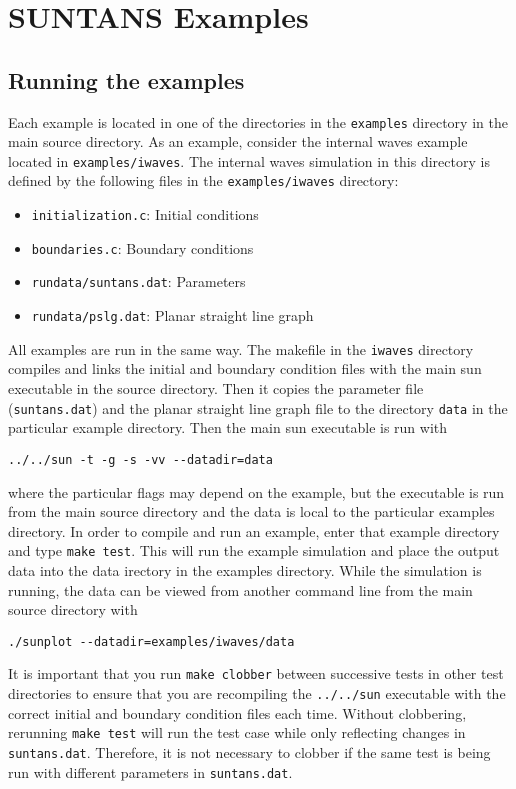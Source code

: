 \documentclass[12pt,oneside]{article}
\begin{document}
\section{SUNTANS Examples} \label{sec:examples}

\subsection{Running the examples}

Each example is located in one of the directories in the \verb+examples+ directory in
the main source directory.  As an example, consider the internal waves example located
in \verb+examples/iwaves+.  The internal waves simulation in this directory is defined by the following files
in the \verb+examples/iwaves+ directory:
\begin{itemize}
\item \verb+initialization.c+: Initial conditions
\item \verb+boundaries.c+: Boundary conditions
\item \verb+rundata/suntans.dat+: Parameters
\item \verb+rundata/pslg.dat+: Planar straight line graph
\end{itemize}
All examples are run in the same way.
The makefile in the \verb+iwaves+ directory compiles and links the initial and boundary condition
files with the main sun executable in the source directory.  Then it copies the parameter
file (\verb+suntans.dat+) and the planar straight line graph file to the directory \verb+data+ in
the particular example directory.  Then the main sun executable is run with
\begin{verbatim}
../../sun -t -g -s -vv --datadir=data
\end{verbatim}
where the particular flags may depend on the example, but the executable is run from
the main source directory and the data is local to the particular examples directory.
In order to compile and run an example, enter that example
directory and type \verb+make test+.  This will run the example simulation and place
the output data into the data irectory in the examples directory.
While the simulation is running, the data can be viewed from another command line
from the main source directory with
\begin{verbatim}
./sunplot --datadir=examples/iwaves/data
\end{verbatim}
It is important that you run \verb+make clobber+ between successive tests in other
test directories to ensure that you are recompiling the \verb+../../sun+ executable
with the correct initial and boundary condition files each time.  Without clobbering,
rerunning \verb+make test+ will run the test case while only reflecting changes in \verb+suntans.dat+.
Therefore, it is not necessary to clobber if the same test is being run with different 
parameters in \verb+suntans.dat+.
\end{document}
